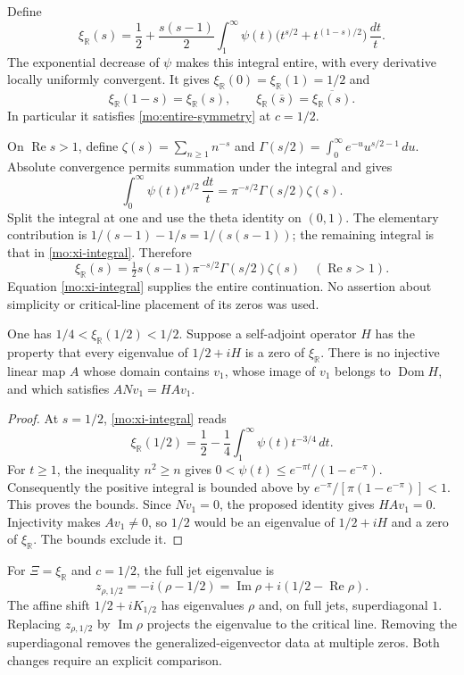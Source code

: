 Define
\begin{equation}
 \xi_{\mathbb R}(s)=\frac12+
 \frac{s(s-1)}2\int_1^\infty
 \psi(t)\bigl(t^{s/2}+t^{(1-s)/2}\bigr)\,\frac{dt}{t}.
 \label{mo:xi-integral}
\end{equation}
The exponential decrease of $\psi$ makes this integral entire,
with every derivative locally uniformly convergent. It gives
$\xi_{\mathbb R}(0)=\xi_{\mathbb R}(1)=1/2$ and
\[
 \xi_{\mathbb R}(1-s)=\xi_{\mathbb R}(s),\qquad
 \xi_{\mathbb R}(\overline s)=\overline{\xi_{\mathbb R}(s)}.
\]
In particular it satisfies \eqref{mo:entire-symmetry} at $c=1/2$.

On $\operatorname{Re}s>1$, define
$\zeta(s)=\sum_{n\geq1}n^{-s}$ and
$\Gamma(s/2)=\int_0^\infty e^{-u}u^{s/2-1}\,du$.
Absolute convergence permits summation under the integral and gives
\[
 \int_0^\infty\psi(t)t^{s/2}\,\frac{dt}{t}
       =\pi^{-s/2}\Gamma(s/2)\zeta(s).
\]
Split the integral at one and use the theta identity on $(0,1)$.
The elementary contribution is
$1/(s-1)-1/s=1/(s(s-1))$; the remaining integral is that in
\eqref{mo:xi-integral}. Therefore
\[
 \xi_{\mathbb R}(s)=
 \tfrac12s(s-1)\pi^{-s/2}\Gamma(s/2)\zeta(s)
 \quad(\operatorname{Re}s>1).
\]
Equation \eqref{mo:xi-integral} supplies the entire continuation.
No assertion about simplicity or critical-line placement of its
zeros was used.

\begin{proposition}
\label{mo:vacuum}
One has $1/4<\xi_{\mathbb R}(1/2)<1/2$.
Suppose a self-adjoint operator $H$ has the property that every
eigenvalue of $1/2+iH$ is a zero of $\xi_{\mathbb R}$.
There is no injective linear map $A$ whose domain contains $v_1$,
whose image of $v_1$ belongs to $\operatorname{Dom}H$, and which
satisfies $ANv_1=HAv_1$.
\end{proposition}
\begin{proof}
At $s=1/2$, \eqref{mo:xi-integral} reads
\[
 \xi_{\mathbb R}(1/2)=\frac12-
          \frac14\int_1^\infty\psi(t)t^{-3/4}\,dt.
\]
For $t\geq1$, the inequality $n^2\geq n$ gives
$0<\psi(t)\leq e^{-\pi t}/(1-e^{-\pi})$.
Consequently the positive integral is bounded above by
$e^{-\pi}/[\pi(1-e^{-\pi})]<1$. This proves the bounds.
Since $Nv_1=0$, the proposed identity gives $HAv_1=0$.
Injectivity makes $Av_1\ne0$, so $1/2$ would be an eigenvalue
of $1/2+iH$ and a zero of $\xi_{\mathbb R}$. The bounds exclude it.
\end{proof}

For $\Xi=\xi_{\mathbb R}$ and $c=1/2$, the full jet eigenvalue is
\[
 z_{\rho,1/2}=-i(\rho-1/2)
       =\operatorname{Im}\rho+i(1/2-\operatorname{Re}\rho).
\]
The affine shift $1/2+iK_{1/2}$ has eigenvalues $\rho$ and, on
full jets, superdiagonal $1$. Replacing $z_{\rho,1/2}$ by
$\operatorname{Im}\rho$ projects the eigenvalue to the critical
line. Removing the superdiagonal removes the generalized-eigenvector
data at multiple zeros. Both changes require an explicit comparison.

